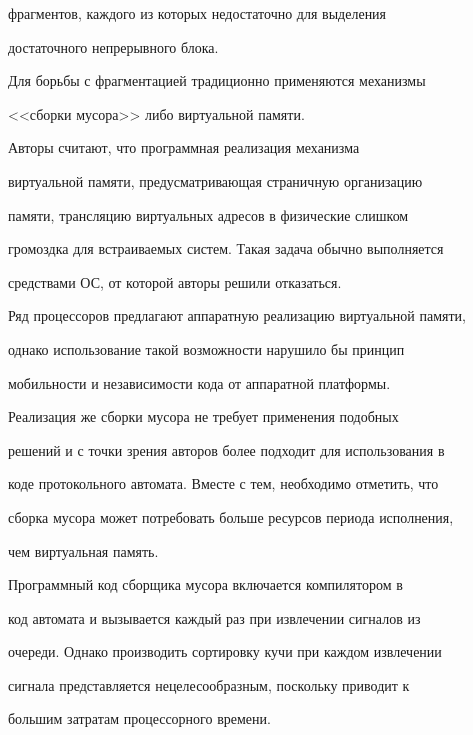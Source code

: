 фрагментов, каждого из которых недостаточно для выделения 


достаточного непрерывного блока. 


      


      Для борьбы с фрагментацией традиционно применяются механизмы 


<<сборки мусора>> либо виртуальной памяти.


      


      Авторы считают, что программная реализация механизма 


виртуальной памяти, предусматривающая страничную организацию 


памяти, трансляцию виртуальных адресов в физические слишком 


громоздка для встраиваемых систем. Такая задача обычно выполняется 


средствами ОС, от которой авторы решили отказаться. 


Ряд процессоров предлагают аппаратную реализацию виртуальной памяти, 


однако использование такой возможности нарушило бы принцип 


мобильности и независимости кода от аппаратной платформы. 


      


      Реализация же сборки мусора не требует применения подобных 


решений и с точки зрения авторов более подходит для использования в 


коде протокольного автомата. Вместе с тем, необходимо отметить, что 


сборка мусора может потребовать больше ресурсов периода исполнения, 


чем виртуальная память.


      


      Программный код сборщика мусора включается компилятором в 


код автомата и вызывается каждый раз при извлечении сигналов из 


очереди. Однако производить сортировку кучи при каждом извлечении 


сигнала представляется нецелесообразным, поскольку приводит к 


большим затратам процессорного времени. 


